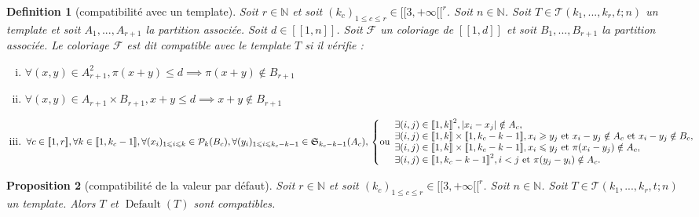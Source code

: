 \documentclass{article}
\newtheorem{definition}{Definition}[section]
\newtheorem{proposition}[definition]{Proposition}
\DeclareMathOperator{\findef}{Default}
\begin{document}
\begin{definition}[compatibilité avec un template]
Soit \(r \in \mathbb{N}\) et soit \((k_c)_{1 \leqslant c \leqslant r}  \in {[\![3, +\infty[\![}^r\). Soit \(n \in \mathbb{N}\). Soit \(T \in \mathcal{T}(k_1, ..., k_r, t; n)\) un template et soit \(A_1, ..., A_{r+1}\) la partition associée. Soit \(d \in [\![1, n]\!]\). Soit \(\mathcal{F}\) un coloriage de \([\![1, d]\!]\) et soit \(B_1, ..., B_{r+1}\) la partition associée. Le coloriage \(\mathcal{F}\) est dit compatible avec le template \(T\) si il vérifie :
\begin{enumerate}[(i)]
\item \(\forall (x,y) \in A_{r+1}^2, \pi(x + y) \leqslant d \implies \pi(x + y)  \notin B_{r+1}\)
\item \(\forall (x,y) \in A_{r+1} \times B_{r+1}, x + y \leqslant d \implies x + y  \notin B_{r+1}\)
\item \(\forall c \in [\![1, r]\!], \forall k \in [\![1, k_c-1]\!], \forall (x_i)_{1 \leqslant i \leqslant k} \in\mathcal{P}_k(B_c), \forall (y_i)_{1 \leqslant i \leqslant k_c - k - 1} \in \mathfrak{S}_{k_c - k - 1}(A_c), \\
	\left\{ \text{ou} 
	\begin{array}{l}
		\exists (i, j) \in {[\![1, k]\!]}^2, |x_i - x_j| \notin A_c, \\
		\exists (i, j) \in [\![1, k]\!] \times [\![1, k_c - k - 1]\!], x_i \geqslant y_j  ~\text{et}~ x_i - y_j \notin A_c ~\text{et}~  x_i - y_j  \notin B_c, \\
		\exists (i, j) \in [\![1, k]\!] \times [\![1, k_c - k - 1]\!], x_i \leqslant y_j  ~\text{et}~ \pi(x_i - y_j) \notin A_c, \\
		\exists (i, j) \in {[\![1, k_c - k - 1]\!]}^2, i < j ~\text{et}~ \pi(y_j - y_i) \notin A_c.
	\end{array}
	\right.\)
\end{enumerate}
\end{definition}

\begin{proposition}[compatibilité de la valeur par défaut]
Soit \(r \in \mathbb{N}\) et soit \((k_c)_{1 \leqslant c \leqslant r}  \in {[\![3, +\infty[\![}^r\). Soit \(n \in \mathbb{N}\). Soit \(T \in \mathcal{T}(k_1, ..., k_r, t; n)\) un template. Alors \(T\) et \(\findef(T)\) sont compatibles.
\end{proposition}
\end{document}
